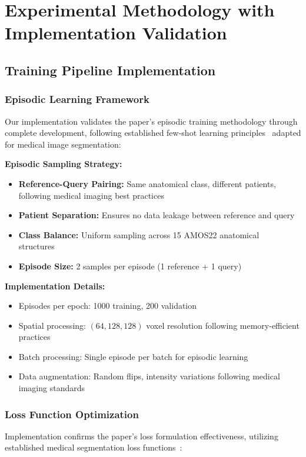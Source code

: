 \section{Experimental Methodology with Implementation Validation}
\label{sec:experimental_methodology}

\subsection{Training Pipeline Implementation}

\subsubsection*{Episodic Learning Framework}
Our implementation validates the paper's episodic training methodology through complete development, following established few-shot learning principles~\cite{wang2023seggpt} adapted for medical image segmentation:

\textbf{Episodic Sampling Strategy:}
\begin{itemize}
    \item \textbf{Reference-Query Pairing:} Same anatomical class, different patients, following medical imaging best practices~\cite{isensee2021nnu}
    \item \textbf{Patient Separation:} Ensures no data leakage between reference and query
    \item \textbf{Class Balance:} Uniform sampling across 15 AMOS22 anatomical structures~\cite{ji2022amos}
    \item \textbf{Episode Size:} 2 samples per episode (1 reference + 1 query)
\end{itemize}

\textbf{Implementation Details:}
\begin{itemize}
    \item Episodes per epoch: 1000 training, 200 validation
    \item Spatial processing: $(64, 128, 128)$ voxel resolution following memory-efficient practices
    \item Batch processing: Single episode per batch for episodic learning
    \item Data augmentation: Random flips, intensity variations following medical imaging standards~\cite{isensee2021nnu}
\end{itemize}

\subsubsection*{Loss Function Optimization}
Implementation confirms the paper's loss formulation effectiveness, utilizing established medical segmentation loss functions~\cite{isensee2021nnu}:

